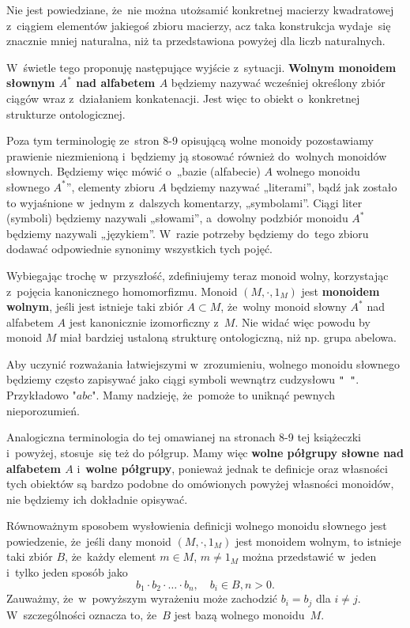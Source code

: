 \documentclass[a4paper,11pt]{article}
\begin{document}
Nie jest powiedziane, że~nie można utożsamić konkretnej macierzy
kwadratowej z~ciągiem elementów jakiegoś zbioru macierzy, acz taka
konstrukcja wydaje~się znacznie mniej naturalna, niż ta przedstawiona
powyżej dla liczb naturalnych.

W~świetle tego proponuję następujące wyjście z~sytuacji.
\textbf{Wolnym monoidem słownym $A^{ * }$ nad alfabetem $A$} będziemy
nazywać wcześniej określony zbiór ciągów wraz z~działaniem
konkatenacji. Jest więc to obiekt o~konkretnej strukturze
ontologicznej.

Poza tym terminologię ze~stron 8-9 opisującą wolne monoidy
pozostawiamy prawienie niezmienioną i~będziemy ją stosować również
do~wolnych monoidów słownych. Będziemy więc mówić o~„bazie (alfabecie)
$A$ wolnego monoidu słownego $A^{ * }$”, elementy zbioru $A$ będziemy
nazywać „literami”, bądź jak zostało to wyjaśnione w~jednym z~dalszych
komentarzy, „symbolami”. Ciągi liter (symboli) będziemy nazywali
„słowami”, a~dowolny podzbiór monoidu $A^{ * }$ będziemy nazywali
„językiem”. W~razie potrzeby będziemy do~tego zbioru dodawać
odpowiednie synonimy wszystkich tych pojęć.

Wybiegając trochę w~przyszłość, zdefiniujemy teraz monoid wolny,
korzystając z~pojęcia kanonicznego homomorfizmu. Monoid
$( M, \cdot, 1_{ M } )$ jest \textbf{monoidem wolnym}, jeśli jest
istnieje taki zbiór $A \subset M$, że~wolny monoid słowny $A^{ * }$
nad alfabetem $A$ jest kanonicznie izomorficzny z~$M$. Nie widać więc
powodu by monoid $M$ miał bardziej ustaloną strukturę ontologiczną,
niż np. grupa abelowa.

Aby uczynić rozważania łatwiejszymi w~zrozumieniu, wolnego monoidu
słownego będziemy często zapisywać jako ciągi symboli wewnątrz
cudzysłowu \texttt{" "}. Przykładowo $\texttt{"} abc \texttt{"}$. Mamy
nadzieję, że~pomoże to uniknąć pewnych nieporozumień.

Analogiczna terminologia do tej omawianej na stronach 8-9 tej
książeczki i~powyżej, stosuje~się też do półgrup. Mamy więc
\textbf{wolne półgrupy słowne nad alfabetem $A$} i~\textbf{wolne
  półgrupy}, ponieważ jednak te definicje oraz własności tych obiektów
są bardzo podobne do omówionych powyżej własności monoidów, nie
będziemy ich dokładnie opisywać.

Równoważnym sposobem wysłowienia definicji wolnego monoidu słownego
jest powiedzenie, że~jeśli dany monoid $( M, \cdot, 1_{ M } )$ jest
monoidem wolnym, to istnieje taki zbiór $B$, że~każdy element
$m \in M$, $m \neq 1_{ M }$ można przedstawić w~jeden i~tylko jeden
sposób jako
\begin{equation}
  \label{eq:Forys-Forys-07}
  b_{ 1 } \cdot b_{ 2 } \cdot \ldots \cdot b_{ n }, \quad
  b_{ i } \in B, n > 0.
\end{equation}
Zauważmy, że~w~powyższym wyrażeniu może zachodzić $b_{ i } = b_{ j }$
dla $i \neq j$. W~szczególności oznacza to, że~$B$ jest bazą wolnego
monoidu~$M$.
\end{document}
